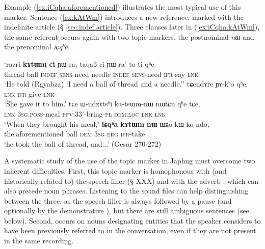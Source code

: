 Example (\ref{ex:iCqha.aforementioned}) illustrates the most typical use of this marker. Sentence (\ref{ex:kAtWm}) introduces a new reference,  marked with the indefinite article  (§ \ref{sec:indef.article}). Three clauses later in (\ref{ex:iCqha.kAtWm}), the same referent occurs again with two topic markers, the postnominal \textit{nɯ} and the prenominal \textit{iɕqʰa}.
 
 
\begin{exe}
\ex \label{ex:iCqha.aforementioned}
\begin{xlist}
\ex \label{ex:kAtWm}
\gll `razri \textbf{kɤtɯm} \textbf{ci} ɲɯ-ra, taqaβ ci ɲɯ-ra' to-ti qʰe   \\
 thread ball \textsc{indef} \textsc{sens}-need needle \textsc{indef} \textsc{sens}-need \textsc{ifr}-say \textsc{lnk}  \\
\glt `He told (Rgyabza) `I need a ball of thread and a needle.''  
\ex  
\gll tɕendɤre ɲɤ-kʰo qʰe,  \\
\textsc{lnk} \textsc{ifr}-give \textsc{lnk}   \\
\glt `She gave it to him.'
\ex 
\gll  tɕe ɯ-ndzɤtsʰi ka-tsɯm-nɯ nɯtɕu qʰe tɕe,   \\
 \textsc{lnk} \textsc{3sg}.\textsc{poss}-meal \textsc{pfv}:3\fl{}3'-bring-\textsc{pl} \textsc{dem}:\textsc{loc}  \textsc{lnk} \textsc{lnk}    \\
\glt `When they brought his meal,'
\ex \label{ex:iCqha.kAtWm}
\gll   \textbf{iɕqʰa} \textbf{kɤtɯm} \textbf{nɯ} ɯʑo kɯ ko-ndo, \\
   the.aforementioned ball \textsc{dem} \textsc{3sg} \textsc{erg} \textsc{ifr}-take \\
\glt `he took the ball of thread, and...' (Gesar 270-272)
\end{xlist}
\end{exe}
 
A systematic study of the use of the topic marker  in Japhug must overcome two inherent difficulties. First, this topic marker is homophonous with (and historically related to) the speech filler  (§ XXX) and with the adverb , which can also precede noun phrases. Listening to the sound files can help distinguishing between the three, as the speech filler is always followed by a pause (and optionally by the demonstrative ), but there are still ambiguous sentences (see below). Second,  occurs on nouns designating entities that the speaker considers to have been previously referred to in the conversation, even if they are not present in the same recording. 

